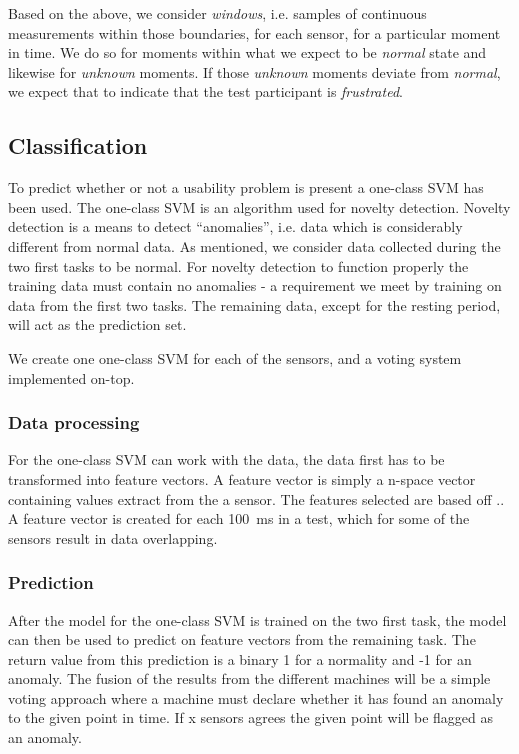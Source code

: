 Based on the above, we consider \textit{windows}, i.e. samples of continuous measurements within those boundaries, for
each sensor, for a particular moment in time. We do so for moments within what we expect to be \textit{normal} state and
likewise for \textit{unknown} moments. If those \textit{unknown} moments deviate from \textit{normal}, we expect that to
indicate that the test participant is \textit{frustrated}.

\subsection{Classification}
To predict whether or not a usability problem is present a one-class SVM has been used. The one-class SVM
is an algorithm used for novelty detection. Novelty detection is a means to detect ``anomalies'', i.e. data which is
considerably different from normal data. As mentioned, we consider data collected during the two first tasks to be
normal. For novelty detection to function properly the training data must contain no anomalies - a requirement we meet
by training on data from the first two tasks. The remaining data, except for the resting
period, will act as the prediction set.

We create one one-class SVM for each of the sensors, and a voting system implemented on-top. 

\subsubsection{Data processing}
For the one-class SVM can work with the data, the data first has to be transformed into feature vectors.
A feature vector is simply a n-space vector containing values extract from the a sensor.
The features selected are based off .. 
A feature vector is created for each 100~ms in a test, which for some of the sensors result in data overlapping.

\subsubsection{Prediction}
After the model for the one-class SVM is trained on the two first task, the model can then be used to predict on feature vectors from the remaining task. 
The return value from this prediction is a binary 1 for a normality and -1 for an anomaly.
The fusion of the results from the different machines will be a simple voting approach where a machine must declare whether it has found an anomaly to the  given point in time. If x sensors agrees the given point will be flagged as an anomaly. 